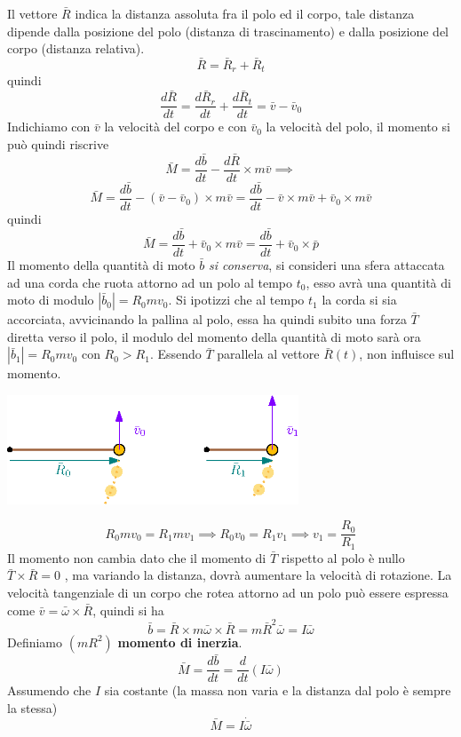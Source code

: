\documentclass[10pt, letterpaper]{report}
\begin{document}
Il vettore $\bar R$ indica la distanza assoluta fra il polo ed il corpo, tale distanza dipende 
dalla posizione del polo (distanza di trascinamento) e dalla posizione del corpo (distanza relativa).
$$ \bar R = \bar R_r + \bar R_t$$
quindi 
$$\frac{d\bar R}{dt}=\frac{d\bar R_r}{dt}+\frac{d\bar R_t}{dt} = \bar v - \bar v_0$$
Indichiamo con $\bar v$ la velocità del corpo e con $\bar v_0$ la velocità del polo, 
il momento si può quindi riscrive
$$\bar M=\frac{d\bar b}{dt}-\frac{d\bar R}{dt}\times m \bar v\implies $$
$$ \bar M = \frac{d\bar b}{dt} -  ( \bar v - \bar v_0)\times m \bar v=
\frac{d\bar b}{dt} -   \bar v\times m \bar v + \bar v_0\times m \bar v 
$$
quindi
$$\bar M =  \frac{d\bar b}{dt} + \bar v_0\times m \bar v =\frac{d\bar b}{dt}+\bar v_0\times \bar p$$
Il momento della quantità di moto $\bar b$ \textit{si conserva}, si consideri una sfera 
attaccata ad una corda che ruota attorno ad un polo al tempo $t_0$, esso avrà una quantità di moto di modulo
$ |\bar b_0| = R_0mv_0$. Si ipotizzi che al tempo $t_1$ la corda si sia accorciata, avvicinando la 
pallina al polo, essa ha quindi subito una forza $\bar T$ diretta verso il polo, il modulo del momento 
della quantità di moto sarà ora $|\bar b_1|=R_0mv_0$ con $R_0>R_1$. Essendo $\bar T$   parallela 
 al vettore $\bar R(t)$, non influisce sul momento.\begin{center}
    \includegraphics[width=0.65\textwidth]{images/conservMomento.eps}
 \end{center}
 $$ R_0mv_0=R_1mv_1\implies R_0v_0=R_1v_1\implies v_1=\frac{R_0}{R_1}$$
Il momento non cambia dato che il momento di $\bar T$ rispetto al polo 
è nullo $\bar T \times \bar R =0$ , ma variando la distanza, dovrà aumentare la velocità di rotazione.\acc 
La velocità tangenziale di un corpo che rotea attorno ad un polo può essere espressa come $\bar v=\bar \omega \times \bar R$, 
quindi si ha 
$$ \bar b = \bar R \times m \bar \omega\times  \bar R=m\bar R^2 \bar \omega = I\bar \omega$$
Definiamo $(mR^2)$ \textbf{momento di inerzia}. 
$$ \bar M = \frac{d\bar b }{dt}=\frac{d}{dt}(I\bar \omega)$$
Assumendo che $I$ sia costante (la massa non varia e la distanza dal polo è sempre la stessa)
$$ \bar M = I\dot{\bar \omega}$$
\end{document}
